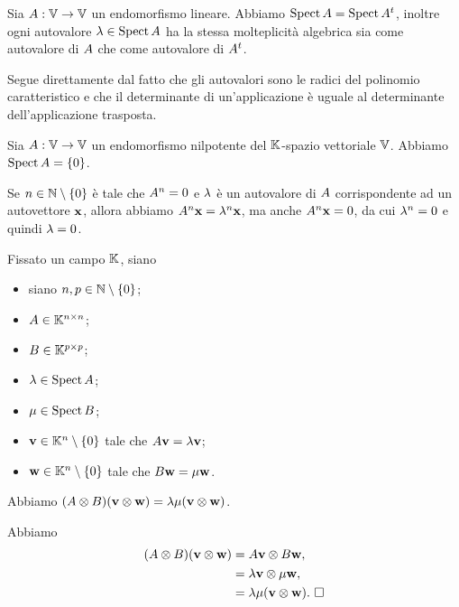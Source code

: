 \begin{Theorem}
	Sia $A: \mathbb{V} \rightarrow \mathbb{V}$ un
  endomorfismo lineare. Abbiamo
  $\operatorname{Spect}{A} =
  \operatorname{Spect}{{A}^t}$, inoltre ogni autovalore
  $\lambda \in \operatorname{Spect}{A}$ ha la stessa molteplicit\`a
  algebrica sia come autovalore di $A$ che come autovalore
  di ${A}^t$.
\end{Theorem}
\Proof Segue direttamente dal fatto che gli autovalori sono le radici del
polinomio caratteristico e che il determinante di un'applicazione \`e uguale
al determinante dell'applicazione trasposta.
\EndProof
\begin{Theorem}
	Sia $A: \mathbb{V} \rightarrow \mathbb{V}$ un
  endomorfismo nilpotente del $\mathbb{K}$-spazio vettoriale $\mathbb{V}$.
  Abbiamo $\operatorname{Spect}{A} = \lbrace 0 \rbrace$.
\end{Theorem}
\Proof Se $n \in \mathbb{N} \setminus \lbrace 0 \rbrace$ \`e tale che
$A^n = 0$ e $\lambda$ \`e un autovalore di
$A$ corrispondente ad un autovettore $\Eigenvector$,
allora abbiamo
$\LinearTransformation^n \Eigenvector = \Eigenvalue^n \Eigenvector$,
ma anche $\LinearTransformation^n \Eigenvector = 0$, da cui
$\lambda^n = 0$ e quindi $\lambda = 0$. \EndProof
\begin{Theorem}
  Fissato un campo $\mathbb{K}$, siano
  \begin{itemize}
    \item siano $n, p \in \mathbb{N} \setminus \lbrace 0 \rbrace$;
    \item $A \in \mathbb{K}^{n \times n}$;
    \item $B \in \mathbb{K}^{p \times p}$;
    \item $\lambda \in \operatorname{Spect}{A}$;
    \item $\mu \in \operatorname{Spect}{B}$;
    \item $\mathbf{v} \in \mathbb{K}^n \setminus \lbrace 0 \rbrace$ tale che
      $A\mathbf{v} = \lambda\mathbf{v}$;
    \item $\mathbf{w} \in \mathbb{K}^n \setminus \lbrace 0 \rbrace$ tale che
      $B\mathbf{w} = \mu\mathbf{w}$.
  \end{itemize}
  Abbiamo
  $(A \otimes B)(\mathbf{v} \otimes \mathbf{w})
  = \lambda\mu (\mathbf{v} \otimes \mathbf{w})$.
\end{Theorem}
\Proof Abbiamo
\begin{align*}
  (A \otimes B)(\mathbf{v} \otimes \mathbf{w})
  &= A\mathbf{v} \otimes B\mathbf{w},\\
  &= \lambda\mathbf{v} \otimes \mu\mathbf{w},\\
  &= \lambda\mu (\mathbf{v} \otimes \mathbf{w}).
  \text{ $\square$}
\end{align*}
